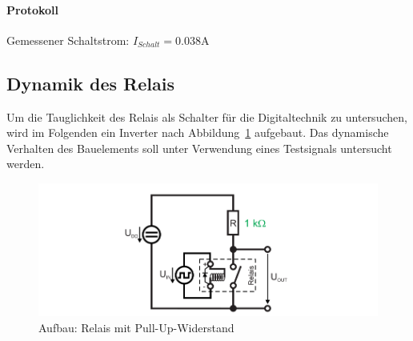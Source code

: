 \documentclass[10pt]{scrreprt}
\begin{document}
    \paragraph{Protokoll}

    Gemessener Schaltstrom: $I_{Schalt} = 0.038\si{\ampere}$

    \subsection{Dynamik des Relais}
    Um die Tauglichkeit des Relais als Schalter für die Digitaltechnik zu untersuchen, wird
    im Folgenden ein Inverter nach Abbildung~\ref{fig:abb12} aufgebaut. Das dynamische Verhalten des
    Bauelements soll unter Verwendung eines Testsignals untersucht werden.

    \begin{figure}[H]
        \includegraphics[width=\textwidth]{abb12.png}
        \caption{Aufbau: Relais mit Pull-Up-Widerstand}
        \label{fig:abb12}
    \end{figure}
\end{document}
